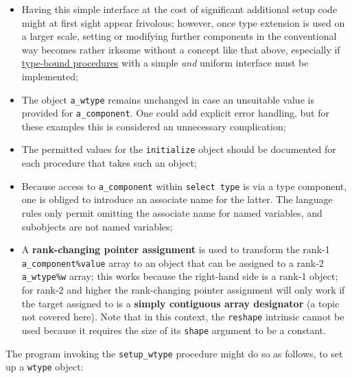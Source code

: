 \documentclass[
  paper=a4,
  ,captions=tableheading
]{scrartcl}
\providecommand{\tightlist}{%
  \setlength{\itemsep}{0pt}\setlength{\parskip}{0pt}}
\begin{document}
\begin{itemize}
\tightlist
\item
  Having this simple interface at the cost of significant additional
  setup code might at first sight appear frivolous; however, once type
  extension is used on a larger scale, setting or modifying further
  components in the conventional way becomes rather irksome without a
  concept like that above, especially if \hyperref[sec:tbp]{type-bound
  procedures} with a simple \emph{and} uniform interface must be
  implemented;
\item
  The object \texttt{a\_wtype} remains unchanged in case an unsuitable
  value is provided for \texttt{a\_component}. One could add explicit
  error handling, but for these examples this is considered an
  unnecessary complication;
\item
  The permitted values for the \texttt{initialize} object should be
  documented for each procedure that takes such an object;
\item
  Because access to \texttt{a\_component} within \texttt{select\ type}
  is via a type component, one is obliged to introduce an associate name
  for the latter. The language rules only permit omitting the associate
  name for named variables, and subobjects are not named variables;
\item
  A \textbf{rank-changing pointer assignment} is used to transform the
  rank-1 \texttt{a\_component\%value} array to an object that can be
  assigned to a rank-2 \texttt{a\_wtype\%w} array; this works because
  the right-hand side is a rank-1 object; for rank-2 and higher the
  rank-changing pointer assignment will only work if the target assigned
  to is a \textbf{simply contiguous array designator} (a topic not
  covered here). Note that in this context, the \texttt{reshape}
  intrinsic cannot be used because it requires the size of its
  \texttt{shape} argument to be a constant.
\end{itemize}

The program invoking the \texttt{setup\_wtype} procedure might do so as
follows, to set up a \texttt{wtype} object:
\end{document}
